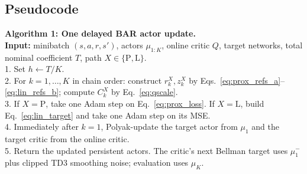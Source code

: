\documentclass[letterpaper]{article}
\begin{document}
\subsection{Pseudocode}
\begin{center}
\begin{minipage}{.94\textwidth}
\small
\textbf{Algorithm 1: One delayed BAR actor update.}\\
\textbf{Input:} minibatch $(s,a,r,s')$, actors $\mu_{1:K}$, online critic $Q$, target networks, total nominal coefficient $T$, path $X\in\{\mathrm{P},\mathrm{L}\}$.\\
1. Set $h\leftarrow T/K$.\\
2. For $k=1,\ldots,K$ in chain order: construct $r_k^X,z_k^X$ by Eqs.~\eqref{eq:prox_refs_a}--\eqref{eq:lin_refs_b}; compute $C_k^X$ by Eq.~\eqref{eq:qscale}.\\
3. If $X=\mathrm{P}$, take one Adam step on Eq.~\eqref{eq:prox_loss}. If $X=\mathrm{L}$, build Eq.~\eqref{eq:lin_target} and take one Adam step on its MSE.\\
4. Immediately after $k=1$, Polyak-update the target actor from $\mu_1$ and the target critic from the online critic.\\
5. Return the updated persistent actors. The critic's next Bellman target uses $\mu_1^-$ plus clipped TD3 smoothing noise; evaluation uses $\mu_K$.
\end{minipage}
\end{center}
\end{document}
